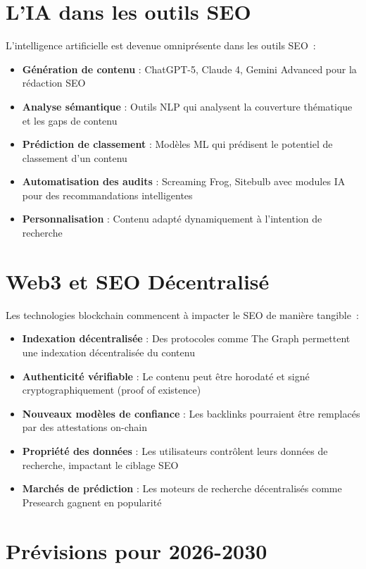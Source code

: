 \documentclass[12pt,a4paper,twoside]{report}
\begin{document}
\section{L'IA dans les outils SEO}

L'intelligence artificielle est devenue omniprésente dans les outils SEO~:

\begin{itemize}
    \item \textbf{Génération de contenu} : ChatGPT-5, Claude 4, Gemini Advanced pour la rédaction SEO
    \item \textbf{Analyse sémantique} : Outils NLP qui analysent la couverture thématique et les gaps de contenu
    \item \textbf{Prédiction de classement} : Modèles ML qui prédisent le potentiel de classement d'un contenu
    \item \textbf{Automatisation des audits} : Screaming Frog, Sitebulb avec modules IA pour des recommandations intelligentes
    \item \textbf{Personnalisation} : Contenu adapté dynamiquement à l'intention de recherche
\end{itemize}

\section{Web3 et SEO Décentralisé}

Les technologies blockchain commencent à impacter le SEO de manière tangible~:

\begin{itemize}
    \item \textbf{Indexation décentralisée} : Des protocoles comme The Graph permettent une indexation décentralisée du contenu
    \item \textbf{Authenticité vérifiable} : Le contenu peut être horodaté et signé cryptographiquement (proof of existence)
    \item \textbf{Nouveaux modèles de confiance} : Les backlinks pourraient être remplacés par des attestations on-chain
    \item \textbf{Propriété des données} : Les utilisateurs contrôlent leurs données de recherche, impactant le ciblage SEO
    \item \textbf{Marchés de prédiction} : Les moteurs de recherche décentralisés comme Presearch gagnent en popularité
\end{itemize}

\section{Prévisions pour 2026-2030}
\end{document}
